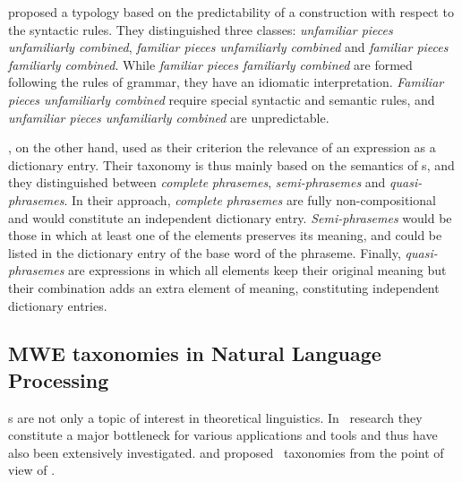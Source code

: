 \documentclass[output=paper]{langsci/langscibook}
\begin{document}
\citet{FillmoreEtAl1988} proposed a typology based on the predictability of a construction with respect to the syntactic rules. 
They distinguished three classes: \textit{unfamiliar pieces unfamiliarly combined}, \textit{familiar pieces unfamiliarly combined} and \textit{familiar pieces familiarly combined}. 
While \textit{familiar pieces familiarly combined} are formed following the rules of grammar, they have an idiomatic interpretation. 
\textit{Familiar pieces unfamiliarly combined} require special syntactic and semantic rules, and \textit{unfamiliar pieces unfamiliarly combined} are unpredictable.

\citet{Melcuk:1995}, on the other hand, used as their criterion the relevance of an expression as a dictionary entry. 
Their taxonomy is thus mainly based on the semantics of \mwe s, and they distinguished between \textit{complete} \linebreak\textit{phrasemes}, \textit{semi-phrasemes} and \textit{quasi-phrasemes}. 
In their approach, \textit{complete phrasemes} are fully non-compositional and would constitute an independent dictionary entry.
\textit{Semi-phrasemes} would be those in which at least one of the elements preserves its meaning, and could be listed in the dictionary entry of the base word of the phraseme. 
Finally, \textit{quasi-phrasemes} are expressions in which all elements keep their original meaning but their combination adds an extra element of meaning, constituting independent dictionary entries. 

\subsection{MWE taxonomies in Natural Language Processing}
\label{ssec:taxonomies_nlp}

\mwe s are not only a topic of interest in theoretical linguistics. 
In \nlp\ research they constitute a major bottleneck for various applications and tools and thus have also been extensively investigated.
\citet{Sag:2002} and \citet{Baldwin2010} proposed \mwe\ taxonomies from the point of view of \nlp. 
\end{document}

